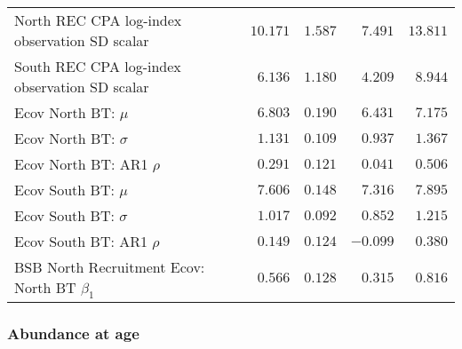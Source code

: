 \documentclass[
]{article}
\begin{document}
\begin{landscape}
\begin{longtable}[t]{lrrrr}
North REC CPA log-index observation SD scalar & $10.171$ & $1.587$ & $7.491$ & $13.811$\\
South REC CPA log-index observation SD scalar & $6.136$ & $1.180$ & $4.209$ & $8.944$\\
Ecov North BT: $\mu$ & $6.803$ & $0.190$ & $6.431$ & $7.175$\\
\addlinespace
Ecov North BT: $\sigma$ & $1.131$ & $0.109$ & $0.937$ & $1.367$\\
Ecov North BT: AR1 $\rho$ & $0.291$ & $0.121$ & $0.041$ & $0.506$\\
Ecov South BT: $\mu$ & $7.606$ & $0.148$ & $7.316$ & $7.895$\\
Ecov South BT: $\sigma$ & $1.017$ & $0.092$ & $0.852$ & $1.215$\\
Ecov South BT: AR1 $\rho$ & $0.149$ & $0.124$ & $-0.099$ & $0.380$\\
\addlinespace
BSB North Recruitment Ecov: North BT $\beta_1$ & $0.566$ & $0.128$ & $0.315$ & $0.816$\\*
\end{longtable}
\end{landscape}

\hypertarget{abundance-at-age}{%
\subsubsection{Abundance at age}\label{abundance-at-age}}
\end{document}
